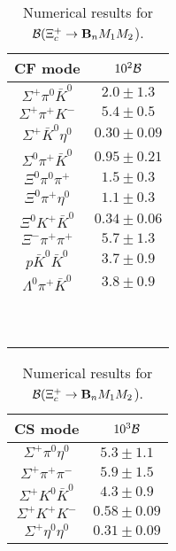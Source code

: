 \begin{table}
\centering
\caption{
	Numerical results for 
	${\cal B}(\Xi_{c}^{+} \to {\bf B}_nM_1M_2$).}\label{pre_Xicp}
	{\scriptsize
		\begin{tabular}{|c|c|}
			\hline
			CF mode& $10^{2}{\cal B}$\\
			\hline
			$ \Sigma^{+} \pi^{0} \bar{K}^{0} $ & $     2.0 \pm     1.3 $ \\
			$\Sigma^{+} \pi^{+} K^{-} $ & $     5.4 \pm     0.5 $ \\
			$ \Sigma^{+} \bar{K}^{0} \eta^{0} $ & $      0.30 \pm     0.09 $ \\
			$\Sigma^{0} \pi^{+} \bar{K}^{0} $ & $     0.95 \pm     0.21 $ \\
			$\Xi^{0} \pi^{0} \pi^{+} $ & $     1.5 \pm     0.3 $ \\
			$\Xi^{0} \pi^{+} \eta^{0} $ & $     1.1 \pm     0.3 $ \\
			$ \Xi^{0} K^{+} \bar{K}^{0} $ & $    0.34 \pm     0.06 $ \\
			$\Xi^{-} \pi^{+} \pi^{+} $ & $     5.7 \pm     1.3 $ \\
			$p \bar{K}^{0} \bar{K}^{0} $ & $     3.7 \pm     0.9 $ \\
			$\Lambda^{0} \pi^{+} \bar{K}^{0} $ & $     3.8 \pm     0.9 $ \\
			&\\
			&\\
			&\\
			&\\
			&\\
			&\\
			&\\
			&\\
			&\\
			&\\
			\hline
		\end{tabular}
		\begin{tabular}{|c|c|}
			\hline
			CS mode&$10^{3}{\cal B}$\\
			\hline
			$ \Sigma^{+} \pi^{0} \eta^{0} $ & $    5.3 \pm    1.1 $ \\
			$ \Sigma^{+} \pi^{+} \pi^{-} $ & $    5.9 \pm    1.5 $ \\
			$ \Sigma^{+} K^{0} \bar{K}^{0} $ & $    4.3 \pm     0.9 $ \\
			$ \Sigma^{+} K^{+} K^{-} $ & $     0.58 \pm     0.09 $ \\
			$\Sigma^{+} \eta^{0} \eta^{0}$ & $     0.31 \pm     0.09 $ \\

\end{tabular}}
\end{table}
